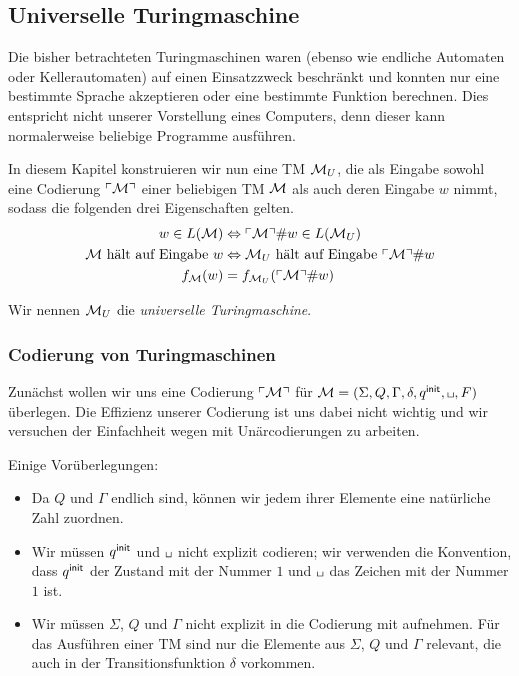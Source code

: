 \subsection{Universelle Turingmaschine}
Die bisher betrachteten Turingmaschinen waren (ebenso wie endliche Automaten oder Kellerautomaten) 
auf einen Einsatzzweck beschränkt und konnten nur eine bestimmte Sprache akzeptieren oder eine bestimmte Funktion berechnen.
Dies entspricht nicht unserer Vorstellung eines Computers, denn dieser kann normalerweise beliebige Programme ausführen.

In diesem Kapitel konstruieren wir nun eine \ac{TM} $\mathcal{M}_U$, die als Eingabe sowohl
eine Codierung $\ulcorner \mathcal{M} \urcorner$ einer beliebigen \ac{TM} $\mathcal{M}$ als auch deren Eingabe $w$ nimmt, sodass die folgenden drei Eigenschaften gelten.
\begin{align}
	\label{Mu-eq-lang} w\in L(\mathcal{M}) &\Leftrightarrow \ulcorner \mathcal{M} \urcorner\#w \in L(\mathcal{M}_U)\\
	\label{Mu-eq-term} \text{$\mathcal{M}$ hält auf Eingabe $w$} &\Leftrightarrow \text{$\mathcal{M}_U$ hält auf Eingabe $\ulcorner \mathcal{M} \urcorner\#w$}\\
	\label{Mu-eq-func} \text{$f_{\mathcal{M}}(w)$} &= \text{$f_{\mathcal{M}_U}(\ulcorner \mathcal{M} \urcorner\#w)$}
\end{align}

Wir nennen $\mathcal{M}_U$ die \emph{universelle Turingmaschine}.

\subsubsection{Codierung von Turingmaschinen}\label{subsec:codeTuring}

Zunächst wollen wir uns eine Codierung $\ulcorner \mathcal{M} \urcorner$ für $\mathcal{\M}=(\Sigma, Q, \Gamma, \delta, \qinit, \blank, F)$ überlegen.
Die Effizienz unserer Codierung ist uns dabei nicht wichtig und wir versuchen der Einfachheit wegen mit Unärcodierungen zu arbeiten.

Einige Vorüberlegungen:
\begin{itemize}
 \item Da $Q$ und $\Gamma$ endlich sind, können wir jedem ihrer Elemente eine natürliche Zahl zuordnen.
 \item Wir müssen $q^\mathsf{init}$ und $\blank$ nicht explizit codieren; wir verwenden die Konvention,
 dass $q^\mathsf{init}$ der Zustand mit der Nummer $1$ und $\blank$ das Zeichen mit der Nummer $1$ ist.
 \item Wir müssen $\Sigma$, $Q$ und $\Gamma$ nicht explizit in die Codierung mit aufnehmen.
 Für das Ausführen einer \ac{TM} sind nur die Elemente aus $\Sigma$, $Q$ und $\Gamma$ relevant, die auch in der Transitionsfunktion $\delta$ vorkommen.
\end{itemize}

